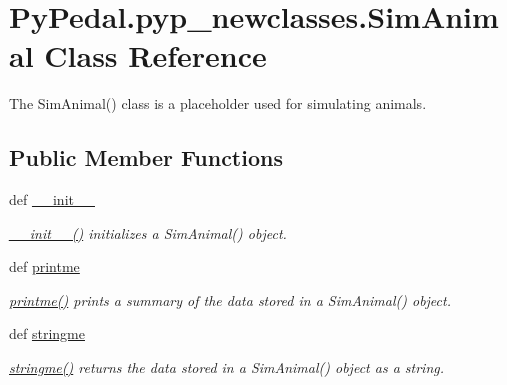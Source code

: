 \hypertarget{classPyPedal_1_1pyp__newclasses_1_1SimAnimal}{
\section{PyPedal.pyp\_\-newclasses.SimAnimal Class Reference}
\label{classPyPedal_1_1pyp__newclasses_1_1SimAnimal}
}


The SimAnimal() class is a placeholder used for simulating animals.  


\subsection*{Public Member Functions}
\begin{DoxyCompactItemize}
\item 
def \hyperlink{classPyPedal_1_1pyp__newclasses_1_1SimAnimal_a58e20d33884ff39a527a16ddaa2b2942}{\_\-\_\-init\_\-\_\-}
\begin{DoxyCompactList}\small\item\em \hyperlink{classPyPedal_1_1pyp__newclasses_1_1SimAnimal_a58e20d33884ff39a527a16ddaa2b2942}{\_\-\_\-init\_\-\_\-()} initializes a SimAnimal() object. \end{DoxyCompactList}\item 
def \hyperlink{classPyPedal_1_1pyp__newclasses_1_1SimAnimal_aa8fd08d0ea72c11691a96b3476c6499d}{printme}
\begin{DoxyCompactList}\small\item\em \hyperlink{classPyPedal_1_1pyp__newclasses_1_1SimAnimal_aa8fd08d0ea72c11691a96b3476c6499d}{printme()} prints a summary of the data stored in a SimAnimal() object. \end{DoxyCompactList}\item 
def \hyperlink{classPyPedal_1_1pyp__newclasses_1_1SimAnimal_a7be8292fd4f0713e344461670ca6c47b}{stringme}
\begin{DoxyCompactList}\small\item\em \hyperlink{classPyPedal_1_1pyp__newclasses_1_1SimAnimal_a7be8292fd4f0713e344461670ca6c47b}{stringme()} returns the data stored in a SimAnimal() object as a string. \end{DoxyCompactList}\end{DoxyCompactItemize}
